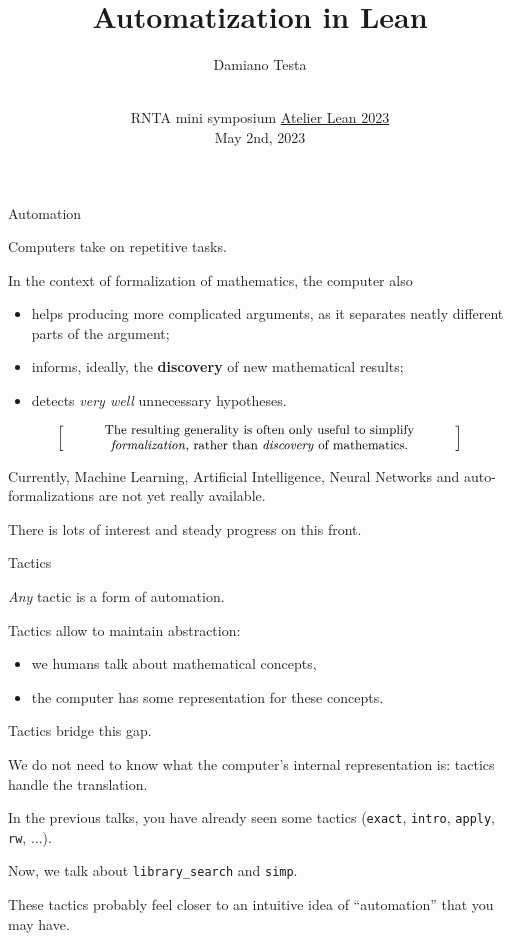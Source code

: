 \documentclass{beamer}
\title{Automatization in Lean}
\author{Damiano Testa}
\institute[]{University of Warwick}
\date[\href{http://www.rnta.eu/7MSRNTA/lean.html}{Atelier Lean 2023}]{\\
\vspace{50pt}
RNTA mini symposium
\href{http://www.rnta.eu/7MSRNTA/lean.html}{Atelier Lean 2023}\\
\vspace{20pt}
May 2nd, 2023
}
\begin{document}
\frame{\titlepage}

\begin{frame}[fragile]
{Automation}

Computers take on repetitive tasks.
\bigskip

In the context of formalization of mathematics, the computer also

\begin{itemize}
\item
  helps producing more complicated arguments, as it separates neatly different parts of the argument;
\item
  informs, ideally, the {\textbf{discovery}} of new mathematical results;
\item
  detects {\emph{very well}} unnecessary hypotheses.
\end{itemize}

\smallskip
\[
  \left[ \;
  \parbox{0.8\textwidth}{\centering\small
  The resulting generality is often only useful to simplify {\emph{formalization}}, rather than {\emph{discovery}} of mathematics.
  }
  \; \right]
\]
\bigskip

Currently, Machine Learning, Artificial Intelligence, Neural Networks and auto-formalizations are not yet really available.
\bigskip

There is lots of interest and steady progress on this front.
\end{frame}

\begin{frame}[fragile]{Tactics}

{\emph{Any}} tactic is a form of automation.
\bigskip

Tactics allow to maintain abstraction:

\begin{itemize}
\item
  we humans talk about mathematical concepts,
\item
  the computer has some representation for these concepts.
\end{itemize}
\bigskip

Tactics bridge this gap.
\bigskip

We do not need to know what the computer's internal representation is: tactics handle the translation.
\end{frame}

\begin{frame}[fragile]

In the previous talks, you have already seen some tactics ({\color{violet}\verb`exact`}, {\color{violet}\verb`intro`}, {\color{violet}\verb`apply`}, {\color{violet}\verb`rw`}, ...).
\bigskip

Now, we talk about {\color{violet}\verb`library_search`} and {\color{violet}\verb`simp`}.
\bigskip

These tactics probably feel closer to an intuitive idea of ``automation'' that you may have.
\end{frame}
\end{document}
